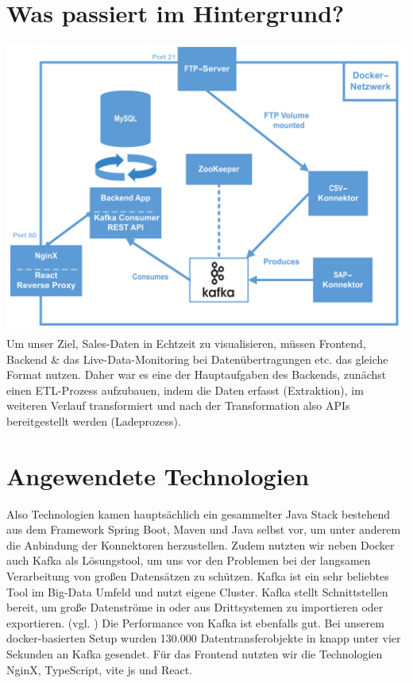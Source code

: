 \section*{Was passiert im Hintergrund?}
\includegraphics[width=\linewidth]{src/abbildungen/Architektur.png}
\newline
Um unser Ziel, Sales-Daten in Echtzeit zu visualisieren, müssen Frontend, Backend & das Live-Data-Monitoring bei Datenübertragungen etc. das gleiche Format nutzen.
\newline
\newline
Daher war es eine der Hauptaufgaben des Backends, zunächst einen ETL-Prozess aufzubauen, indem die Daten erfasst (Extraktion), im weiteren Verlauf transformiert und nach der Transformation also APIs bereitgestellt werden (Ladeprozess).
\newline


\section*{Angewendete Technologien}
Also Technologien kamen hauptsächlich ein gesammelter Java Stack bestehend aus dem Framework Spring Boot, Maven und Java selbst vor, um unter anderem die Anbindung der Konnektoren herzustellen.
\newline
Zudem nutzten wir neben Docker auch Kafka als Lösungstool, um uns vor den Problemen bei der langsamen Verarbeitung von großen Datensätzen zu schützen. Kafka ist ein sehr beliebtes Tool im Big-Data Umfeld und nutzt eigene Cluster. Kafka stellt Schnittstellen bereit, um große Datenströme in oder aus Drittsystemen zu importieren oder exportieren. (vgl. \cite{kafka2018})
\newline
\newline
Die Performance von Kafka ist ebenfalls gut. Bei unserem docker-basierten Setup wurden 130.000 Datentransferobjekte in knapp unter vier Sekunden an Kafka gesendet.
\newline
Für das Frontend nutzten wir die Technologien NginX, TypeScript, vite js und React.
